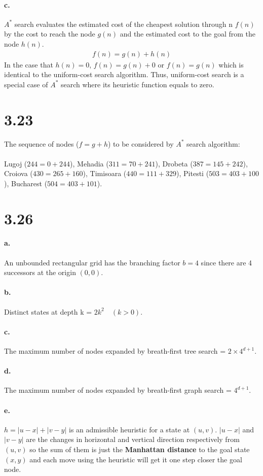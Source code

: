 \documentclass[a4paper]{article}
\begin{document}
\paragraph{c.} $A^{*}$ search evaluates the estimated cost of the cheapest solution through n $f(n)$ by the cost to reach the node $g(n)$ and the estimated cost to the goal from the node $h(n)$.
\begin{align*}
f(n) = g(n) + h(n)
\end{align*}
In the case that $h(n) = 0$, $f(n) = g(n) + 0$ or $f(n) = g(n)$ which is identical to the uniform-cost search algorithm. Thus, uniform-cost search is a special case of $A^{*}$ search where its heuristic function equals to zero.

\section*{3.23}
The sequence of nodes ($f = g + h$) to be considered by $A^{*}$ search algorithm: \\
\\
Lugoj ($244 = 0 + 244$), Mehadia ($311 = 70 + 241$), Drobeta ($387 = 145 + 242$), Croiova ($430 = 265 + 160$), Timisoara ($440 = 111 + 329$), Pitesti ($503 = 403 + 100$), Bucharest ($504 = 403 + 101$).

\section*{3.26}

\paragraph{a.} An unbounded rectangular grid has the branching factor $b = 4$ since there are 4 successors at the origin $(0, 0)$.

\paragraph{b.} Distinct states at depth k = $2k^{2} \quad (k > 0)$.

\paragraph{c.} The maximum number of nodes expanded by breath-first tree search = $2 \times 4^{d+1}$.

\paragraph{d.} The maximum number of nodes expanded by breath-first graph search = $4^{d+1}$.

\paragraph{e.} $h = |u - x| + |v - y|$ is an admissible heuristic for a state at $(u, v)$. $|u-x|$ and $|v-y|$ are the changes in horizontal and vertical direction respectively from $(u, v)$ so the sum of them is just the {\bf Manhattan distance} to the goal state $(x, y)$ and each move using the heuristic will get it one step closer the goal node.\\
\\
\end{document}
